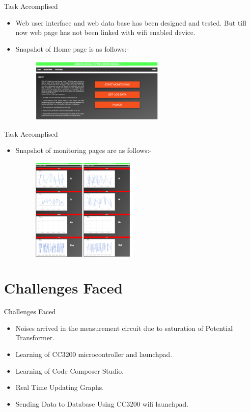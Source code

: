 \documentclass[10pt, a4paper]{beamer}
\begin{document}
\begin{frame}{Task Accomplised}
	\begin{itemize}
		\item Web user interface and web data base has been designed and tested. But till now web page has not been linked with wifi enabled device.
		\item Snapshot of Home page is as follows:-  
		\begin{figure}[h]
			\includegraphics[width=250px]{page1}
		\end{figure}
	\end{itemize}
\end{frame}
\begin{frame}{Task Accomplised}
	\begin{itemize}
		\item Snapshot of monitoring pages are as follows:-  
		\begin{figure}[h]
			\includegraphics[width=200px]{page2}
		\end{figure}
	\end{itemize}
\end{frame}

\section{Challenges Faced}
\begin{frame}{Challenges Faced}
	\begin{itemize}
		\item Noises arrived in the measurement circuit due to saturation of Potential Transformer.
		\item Learning of CC3200 microcontroller and launchpad.
		\item Learning of Code Composer Studio.
		\item Real Time Updating Graphs.
		\item Sending Data to Database Using CC3200 wifi launchpad.    
	\end{itemize}
\end{frame}
\end{document}
